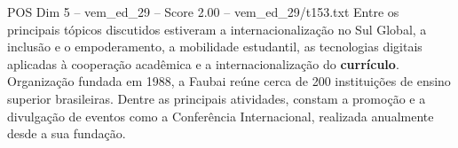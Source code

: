 \begin{textsample}{POS Dim 5 – vem\_ed\_29 – Score 2.00 – vem\_ed\_29/t153.txt}
Entre os principais tópicos discutidos estiveram a internacionalização no Sul Global, a inclusão e o empoderamento, a mobilidade estudantil, as tecnologias digitais aplicadas à cooperação acadêmica e a internacionalização do \textbf{currículo}.
Organização fundada em 1988, a Faubai reúne cerca de 200 instituições de ensino superior brasileiras.
Dentre as principais atividades, constam a promoção e a divulgação de eventos como a Conferência Internacional, realizada anualmente desde a sua fundação.

\end{textsample}
